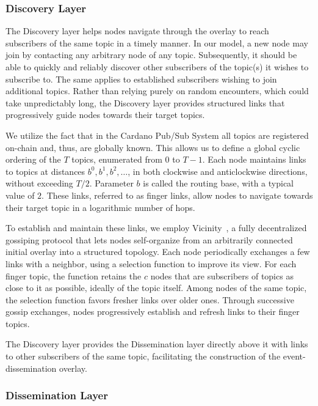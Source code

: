 \subsubsection{Discovery Layer}
\label{ subsubsec:discovery-layer}

The Discovery layer helps nodes navigate through the overlay to reach subscribers of the same topic in a timely manner.
In our model, a new node may join by contacting any arbitrary node of any topic.
Subsequently, it should be able to quickly and reliably discover other subscribers of the topic(s) it wishes to subscribe to.
The same applies to established subscribers wishing to join additional topics.
Rather than relying purely on random encounters, which could take unpredictably long, the Discovery layer provides structured links that progressively guide nodes towards their target topics.

We utilize the fact that in the Cardano Pub/Sub System all topics are registered on-chain and, thus, are globally known.
This allows us to define a global cyclic ordering of the $T$ topics, enumerated from $0$ to $T-1$.
Each node maintains links to topics at distances $b^0, b^1, b^2, \ldots$, in both clockwise and anticlockwise directions, without exceeding $T/2$.
Parameter $b$ is called the routing base, with a typical value of $2$.
These links, referred to as finger links, allow nodes to navigate towards their target topic in a logarithmic number of hops.

To establish and maintain these links, we employ Vicinity~\cite{Vicinity}, a fully decentralized gossiping protocol that lets nodes self-organize from an arbitrarily connected initial overlay into a structured topology.
Each node periodically exchanges a few links with a neighbor, using a selection function to improve its view.
For each finger topic, the function retains the $c$ nodes that are subscribers of topics as close to it as possible, ideally of the topic itself.
Among nodes of the same topic, the selection function favors fresher links over older ones.
Through successive gossip exchanges, nodes progressively establish and refresh links to their finger topics.

The Discovery layer provides the Dissemination layer directly above it with links to other subscribers of the same topic, facilitating the construction of the event-dissemination overlay.

\subsubsection{Dissemination Layer}

